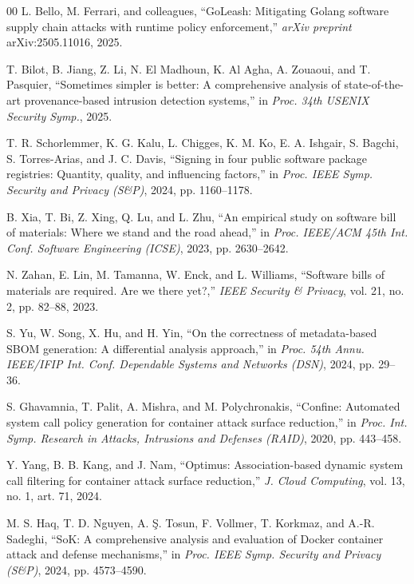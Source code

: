 \documentclass[conference]{IEEEtran}
\begin{document}
\begin{thebibliography}{00}
 L. Bello, M. Ferrari, and colleagues,
``GoLeash: Mitigating Golang software supply chain attacks with runtime
policy enforcement,'' \textit{arXiv preprint} arXiv:2505.11016, 2025.

 T. Bilot, B. Jiang, Z. Li, N. El Madhoun,
K. Al Agha, A. Zouaoui, and T. Pasquier, ``Sometimes simpler is better:
A comprehensive analysis of state-of-the-art provenance-based intrusion
detection systems,'' in \textit{Proc. 34th USENIX Security Symp.},
2025.

 T. R. Schorlemmer, K. G. Kalu, L. Chigges,
K. M. Ko, E. A. Ishgair, S. Bagchi, S. Torres-Arias, and J. C. Davis,
``Signing in four public software package registries: Quantity,
quality, and influencing factors,'' in \textit{Proc. IEEE Symp.
Security and Privacy (S\&P)}, 2024, pp. 1160--1178.

 B. Xia, T. Bi, Z. Xing, Q. Lu, and L. Zhu, ``An
empirical study on software bill of materials: Where we stand and the
road ahead,'' in \textit{Proc. IEEE/ACM 45th Int. Conf. Software
Engineering (ICSE)}, 2023, pp. 2630--2642.

 N. Zahan, E. Lin, M. Tamanna, W. Enck, and
L. Williams, ``Software bills of materials are required. Are we there
yet?,'' \textit{IEEE Security \& Privacy}, vol. 21, no. 2,
pp. 82--88, 2023.

 S. Yu, W. Song, X. Hu, and H. Yin, ``On the
correctness of metadata-based SBOM generation: A differential analysis
approach,'' in \textit{Proc. 54th Annu. IEEE/IFIP Int. Conf. Dependable
Systems and Networks (DSN)}, 2024, pp. 29--36.


 S. Ghavamnia, T. Palit, A. Mishra, and
M. Polychronakis, ``Confine: Automated system call policy generation
for container attack surface reduction,'' in \textit{Proc. Int. Symp.
Research in Attacks, Intrusions and Defenses (RAID)}, 2020,
pp. 443--458.

 Y. Yang, B. B. Kang, and J. Nam, ``Optimus:
Association-based dynamic system call filtering for container attack
surface reduction,'' \textit{J. Cloud Computing}, vol. 13, no. 1,
art. 71, 2024.

 M. S. Haq, T. D. Nguyen, A. \c{S}. Tosun,
F. Vollmer, T. Korkmaz, and A.-R. Sadeghi, ``SoK: A comprehensive
analysis and evaluation of Docker container attack and defense
mechanisms,'' in \textit{Proc. IEEE Symp. Security and Privacy (S\&P)},
2024, pp. 4573--4590.


\end{thebibliography}
\end{document}
